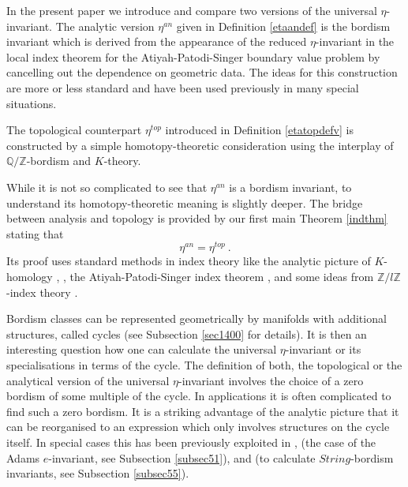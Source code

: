 \documentclass[12pt]{article}
\newcommand{\Z}{{\mathbb{Z}}}
\newcommand{\Q}{{\mathbb{Q}}}
\begin{document}
 
 

In the present paper we introduce and compare two versions of the  universal $\eta$-invariant.  The analytic version  $\eta^{an}$  given in Definition \ref{etaandef} is the bordism invariant which is derived from the appearance of the reduced  $\eta$-invariant in the local index theorem for the Atiyah-Patodi-Singer boundary value problem by cancelling out the dependence on geometric data. The ideas for this construction are 
more or less standard and have been used previously in many special situations.
  
The topological counterpart $\eta^{top}$ introduced in Definition \ref{etatopdefv} is constructed by a simple  homotopy-theoretic consideration using the interplay of $\Q/\Z$-bordism and $K$-theory.
 

While it is not so complicated to see  that $\eta^{an}$ is a bordism invariant, to understand its homotopy-theoretic meaning is slightly deeper. The bridge between analysis and topology is provided by our first main Theorem \ref{indthm}
stating that $$\eta^{an}=\eta^{top}\ 
.$$
Its proof uses standard methods in index theory like the analytic picture of  $K$-homology \cite{MR679698}, \cite{MR918241}, 
the Atiyah-Patodi-Singer index theorem \cite{MR0397797}, and some ideas from $\Z/l\Z$-index theory \cite{MR1144425}.

Bordism classes can be  represented geometrically by manifolds with additional structures, called cycles (see Subsection \ref{sec1400} for details). It is then an interesting question how one can calculate the universal $\eta$-invariant or its specialisations in terms of the cycle.  The definition of both, the topological or the analytical version of the universal $\eta$-invariant involves the choice of a zero bordism of some multiple of the cycle. In applications it is often complicated to find such a zero bordism.
It is a striking advantage of the analytic picture that it can be reorganised to an expression which only
involves structures on the cycle itself. In special cases this has been previously exploited in \cite{MR687857}, \cite{MR762355} (the case of the Adams $e$-invariant, see Subsection \ref{subsec51}),  and 
\cite{2009arXiv0912.4875B} (to calculate $String$-bordism invariants, see  Subsection \ref{subsec55}).
\end{document}
